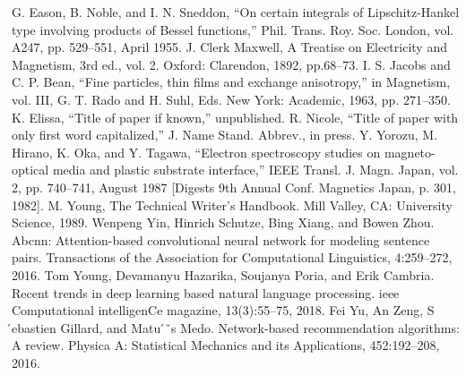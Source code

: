 \documentclass[conference]{IEEEtran}
\begin{document}
\begin{thebibliography}{00}
 G. Eason, B. Noble, and I. N. Sneddon, ``On certain integrals of Lipschitz-Hankel type involving products of Bessel functions,'' Phil. Trans. Roy. Soc. London, vol. A247, pp. 529--551, April 1955.
 J. Clerk Maxwell, A Treatise on Electricity and Magnetism, 3rd ed., vol. 2. Oxford: Clarendon, 1892, pp.68--73.
 I. S. Jacobs and C. P. Bean, ``Fine particles, thin films and exchange anisotropy,'' in Magnetism, vol. III, G. T. Rado and H. Suhl, Eds. New York: Academic, 1963, pp. 271--350.
 K. Elissa, ``Title of paper if known,'' unpublished.
 R. Nicole, ``Title of paper with only first word capitalized,'' J. Name Stand. Abbrev., in press.
 Y. Yorozu, M. Hirano, K. Oka, and Y. Tagawa, ``Electron spectroscopy studies on magneto-optical media and plastic substrate interface,'' IEEE Transl. J. Magn. Japan, vol. 2, pp. 740--741, August 1987 [Digests 9th Annual Conf. Magnetics Japan, p. 301, 1982].
 M. Young, The Technical Writer's Handbook. Mill Valley, CA: University Science, 1989.
 Wenpeng Yin, Hinrich Schutze, Bing Xiang, and Bowen Zhou. Abcnn: Attention-based convolutional neural network for modeling sentence pairs. Transactions of the Association for Computational Linguistics, 4:259–272, 2016. 
 Tom Young, Devamanyu Hazarika, Soujanya Poria, and Erik Cambria. Recent trends in deep learning based natural language processing. ieee Computational intelligenCe magazine, 13(3):55–75, 2018. 
 Fei Yu, An Zeng, S ́ebastien Gillard, and Matu ́ˇs Medo. Network-based recommendation algorithms: A review. Physica A: Statistical Mechanics and its Applications, 452:192–208, 2016. 
\end{thebibliography}

% 
\end{document}
